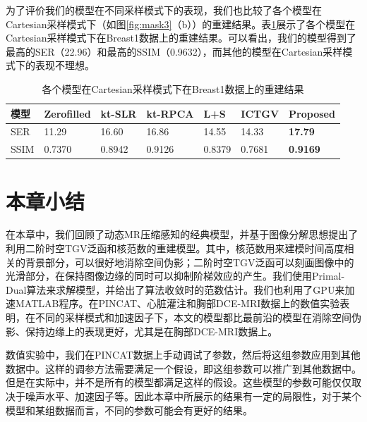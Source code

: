 为了评价我们的模型在不同采样模式下的表现，我们也比较了各个模型在Cartesian采样模式下（如图\ref{fig:mask3}（b））的重建结果。表\ref{tab:cartesian}展示了各个模型在Cartesian采样模式下在Breast1数据上的重建结果。可以看出，我们的模型得到了最高的SER（22.96）和最高的SSIM（0.9632），而其他的模型在Cartesian采样模式下的表现不理想。
\begin{table}
\centering
\caption{各个模型在Cartesian采样模式下在Breast1数据上的重建结果}
\begin{center}
\begin{tabular}{|l|l|l|l|l|l|l|}
\hline
\hline
模型 & Zerofilled & kt-SLR & kt-RPCA & L+S & ICTGV & Proposed \\
\hline
SER & 11.29 & 16.60 & 16.86 & 14.55 & 14.33 & \textbf{17.79} \\
\hline
SSIM & 0.7370 & 0.8942 & 0.9126 & 0.8379 & 0.7681 & \textbf{0.9169}\\
\hline
\end{tabular}
\end{center}
\label{tab:cartesian}
\end{table}

\section{本章小结}
在本章中，我们回顾了动态MR压缩感知的经典模型，并基于图像分解思想提出了利用二阶时空TGV泛函和核范数的重建模型。其中，核范数用来建模时间高度相关的背景部分，可以很好地消除空间伪影；二阶时空TGV泛函可以刻画图像中的光滑部分，在保持图像边缘的同时可以抑制阶梯效应的产生。我们使用Primal-Dual算法来求解模型，并给出了算法收敛时的范数估计。我们也利用了GPU来加速MATLAB程序。在PINCAT、心脏灌注和胸部DCE-MRI数据上的数值实验表明，在不同的采样模式和加速因子下，本文的模型都比最前沿的模型在消除空间伪影、保持边缘上的表现更好，尤其是在胸部DCE-MRI数据上。

数值实验中，我们在PINCAT数据上手动调试了参数，然后将这组参数应用到其他数据中。这样的调参方法需要满足一个假设，即这组参数可以推广到其他数据中。但是在实际中，并不是所有的模型都满足这样的假设。这些模型的参数可能仅仅取决于噪声水平、加速因子等。因此本章中所展示的结果有一定的局限性，对于某个模型和某组数据而言，不同的参数可能会有更好的结果。

















